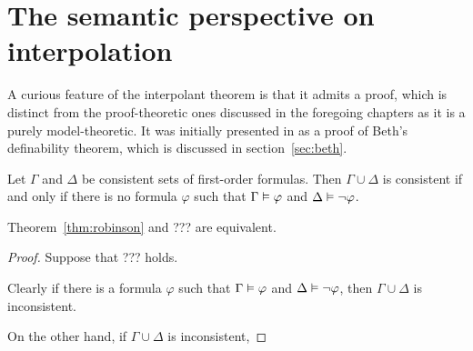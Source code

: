 
\chapter{The semantic perspective on interpolation}

A curious feature of the interpolant theorem is that it admits a proof, which is distinct from the proof-theoretic ones discussed in the foregoing chapters as it is a purely model-theoretic.
It was initially presented in \cite{robinson1956result} as a proof of Beth's definability theorem, which is discussed in section~\ref{sec:beth}.

\begin{thm}
	\label{thm:robinson}
	Let $\Gamma$ and $\Delta$ be consistent sets of first-order formulas.
	Then $\Gamma \cup \Delta$ is consistent if and only if there is no formula $\varphi$ such that $\Gamma \vDash \varphi$ and $\Delta \vDash \lnot \varphi$.
\end{thm}


\begin{prop}
	Theorem~\ref{thm:robinson} and ??? are equivalent.
\end{prop}
\begin{proof}
	Suppose that ??? holds.

	Clearly if there is a formula $\varphi$ such that $\Gamma\vDash \varphi$ and $\Delta\vDash \lnot \varphi$, then $\Gamma \cup \Delta $ is inconsistent.

	On the other hand, if $\Gamma\cup\Delta$ is inconsistent, 


\end{proof}


